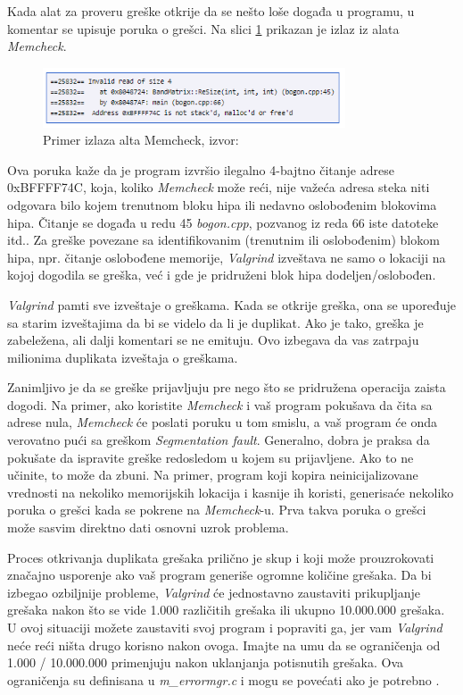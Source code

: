 \documentclass[12pt,oneside]{memoir}
\theoremstyle{plain}
\theoremstyle{definition}
\begin{document}
Kada alat za proveru greške otkrije da se nešto loše događa u programu, u komentar se upisuje poruka o grešci. Na slici \ref{fig:slika2.1} prikazan je izlaz iz alata \textit{Memcheck}.
\begin{figure}[!ht]
  \centering
  \includegraphics[width=0.8\textwidth]{errorReporting.png}
  \caption{Primer izlaza alta Memcheck, izvor: \cite{ValgrindCore}}
  \label{fig:slika2.1}
\end{figure}

Ova poruka kaže da je program izvršio ilegalno 4-bajtno čitanje adrese 0xBFFFF74C, koja, koliko \textit{Memcheck} može reći, nije važeća adresa steka niti odgovara bilo kojem trenutnom bloku hipa ili nedavno oslobođenim blokovima hipa. Čitanje se događa u redu 45 \textit{bogon.cpp}, pozvanog iz reda 66 iste datoteke itd.. Za greške povezane sa identifikovanim (trenutnim ili oslobođenim) blokom hipa, npr. čitanje oslobođene memorije, \textit{Valgrind} izveštava ne samo o lokaciji na kojoj dogodila se greška, već i gde je pridruženi blok hipa dodeljen/oslobođen.

\textit{Valgrind} pamti sve izveštaje o greškama. Kada se otkrije greška, ona se upoređuje sa starim izveštajima da bi se videlo da li je duplikat. Ako je tako, greška je zabeležena, ali dalji komentari se ne emituju. Ovo izbegava da vas zatrpaju milionima duplikata izveštaja o greškama.  

Zanimljivo je da se greške prijavljuju pre nego što se pridružena operacija zaista dogodi. Na primer, ako koristite \textit{Memcheck} i vaš program pokušava da čita sa adrese nula, \textit{Memcheck} će poslati poruku u tom smislu, a vaš program će onda verovatno pući sa greškom \textit{Segmentation fault}. Generalno, dobra je praksa da pokušate da ispravite greške redosledom u kojem su prijavljene. Ako to ne učinite, to može da zbuni. Na primer, program koji kopira neinicijalizovane vrednosti na nekoliko memorijskih lokacija i kasnije ih koristi, generisaće nekoliko poruka o grešci kada se pokrene na \textit{Memcheck}-u. Prva takva poruka o grešci može sasvim direktno dati osnovni uzrok problema. 

Proces otkrivanja duplikata grešaka prilično je skup i koji može prouzrokovati značajno usporenje ako vaš program generiše ogromne količine grešaka. Da bi izbegao ozbiljnije probleme, \textit{Valgrind} će jednostavno zaustaviti prikupljanje grešaka nakon što se vide 1.000 različitih grešaka ili ukupno 10.000.000 grešaka. U ovoj situaciji možete zaustaviti svoj program i popraviti ga, jer vam \textit{Valgrind} neće reći ništa drugo korisno nakon ovoga. Imajte na umu da se ograničenja od 1.000 / 10.000.000 primenjuju nakon uklanjanja potisnutih grešaka. Ova ograničenja su definisana u \textit{m\_errormgr.c} i mogu se povećati ako je potrebno \cite{ValgrindCore}. 
\end{document}
